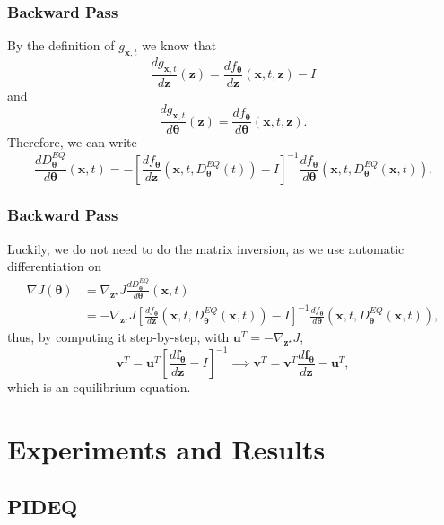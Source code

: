 \documentclass[t]{beamer}
\begin{document}
\begin{frame}
    \frametitle{Backward Pass}
    
    By the definition of $g_{\bm{x},t}$ we know that \[
	\frac{d g_{\bm{x},t}}{d \bm{z}}(\bm{z}) = \frac{d f_{\bm{\theta}}}{d \bm{z}}(\bm{x},t,\bm{z}) - I 
    \] and \[
    \frac{d g_{\bm{x},t}}{d \bm{\theta}}(\bm{z}) = \frac{d f_{\bm{\theta}}}{d \bm{\theta}}(\bm{x},t,\bm{z})
    .\] Therefore, we can write \[
    \frac{d D^{EQ}_{\bm{\theta}}}{d \bm{\theta}}(\bm{x},t) = - \left[ \frac{d f_{\bm{\theta}}}{d \bm{z}}(\bm{x},t,D^{EQ}_{\bm{\theta}}(t)) - I \right]^{-1} \frac{d f_{\bm{\theta}}}{d \bm{\theta}}(\bm{x},t,D^{EQ}_{\bm{\theta}}(\bm{x},t))
    .\] 
\end{frame}

\begin{frame}
    \frametitle{Backward Pass}

    Luckily, we do not need to do the matrix inversion, as we use automatic differentiation on
    \begin{align*}
	\nabla J\left( \bm{\theta} \right) &= \nabla_{\bm{z}^{\star}} J \frac{d D^{EQ}_{\bm{\theta}}}{d \bm{\theta}}(\bm{x},t) \\
	&= - \nabla_{\bm{z}^{\star}} J \left[ \frac{d f_{\bm{\theta}}}{d \bm{z}}(\bm{x},t,D^{EQ}_{\bm{\theta}}(\bm{x},t)) - I \right]^{-1} \frac{d f_{\bm{\theta}}}{d \bm{\theta}}(\bm{x},t,D^{EQ}_{\bm{\theta}}(\bm{x},t)),
    \end{align*}\pause
    thus, by computing it step-by-step, with $\bm{u}^T=- \nabla_{\bm{z}^{\star}} J$, \[
	\bm{v}^T = \bm{u}^T\left[ \frac{d \bm{f}_{\bm{\theta}}}{d \bm{z}} - I \right]^{-1} \implies \bm{v}^T = \bm{v}^T \frac{d \bm{f}_{\bm{\theta}}}{d \bm{z}} - \bm{u}^T
    ,\] which is an equilibrium equation.
\end{frame}

\section{Experiments and Results}

\subsection{PIDEQ}
\end{document}
